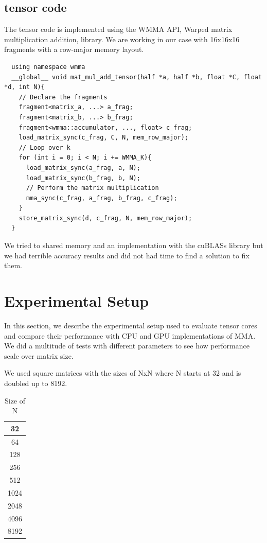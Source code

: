 \documentclass[conference]{IEEEtran}
\begin{document}
  
  \subsection{tensor code}\label{sec:tensorCode}
  The tensor code is implemented using the WMMA API,  Warped matrix multiplication addition,
  library. We are working in our case with 16x16x16 fragments with a row-major memory layout.
  \begin{lstlisting}
  using namespace wmma
  __global__ void mat_mul_add_tensor(half *a, half *b, float *C, float *d, int N){
    // Declare the fragments
    fragment<matrix_a, ...> a_frag;
    fragment<matrix_b, ...> b_frag;
    fragment<wmma::accumulator, ..., float> c_frag;
    load_matrix_sync(c_frag, C, N, mem_row_major);
    // Loop over k
    for (int i = 0; i < N; i += WMMA_K){
      load_matrix_sync(a_frag, a, N);
      load_matrix_sync(b_frag, b, N);
      // Perform the matrix multiplication
      mma_sync(c_frag, a_frag, b_frag, c_frag);
    }
    store_matrix_sync(d, c_frag, N, mem_row_major);
  }
  \end{lstlisting}

  We tried to shared memory and an implementation with the cuBLASs library but we had terrible 
  accuracy results and did not had time to find a solution to fix them. 

  \section{Experimental Setup}\label{sec:experimental-setup}
  
  In this section, we describe the experimental setup used to evaluate 
  tensor cores and compare their performance with CPU and GPU implementations of MMA.
  We did a multitude of tests with different parameters to see how performance scale over matrix size.

  We used square matrices with the sizes of NxN where N starts at 32 and is doubled up to 8192.

  \begin{table}[h]
    \caption{Size of N}
  \centering
    \begin{tabular}{|c|}
    \hline
    32 \\
    \hline
    64 \\
    \hline
    128 \\
    \hline
    256 \\
    \hline
    512 \\
    \hline
    1024 \\
    \hline
    2048 \\
    \hline
    4096 \\
    \hline
    8192 \\
    \hline

    \end{tabular}
  \end{table}
\end{document}

